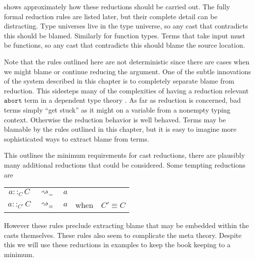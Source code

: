  shows approximately how these reductions should be carried out.
The fully formal reduction rules are listed later, but their complete detail can be distracting.
Type universes live in the type universe, so any cast that contradicts this should be blamed.
Similarly for function types.
Terms that take input must be functions, so any cast that contradicts this should blame the source location.
 
Note that the rules outlined here are not deterministic since there are cases when we might blame or continue reducing the argument.
One of the subtle innovations of the system described in this chapter is to completely separate blame from reduction.
This sidesteps many of the complexities of having a reduction relevant $\mathtt{abort}$ term in a dependent type theory \cite{sjoberg2012irrelevance,pedrot2018failure}.
As far as reduction is concerned, bad terms simply ``get stuck'' as it might on a variable from a nonempty typing context.
Otherwise the reduction behavior is well behaved.
Terms may be blamable by the rules outlined in this chapter, but it is easy to imagine more sophisticated ways to extract blame from terms.
 
This outlines the minimum requirements for cast reductions, there are plausibly many additional reductions that could be considered.
Some tempting reductions are
 
\begin{tabular}{ccccc}
$a::_{C}C$ & $\rightsquigarrow_{=}$ & $a$ &  & \tabularnewline
$a::_{C'}C$ & $\rightsquigarrow_{\equiv}$ & $a$ & when & $C'\equiv C$\tabularnewline
\end{tabular}
 
However these rules preclude extracting blame that may be embedded within the casts themselves.
These rules also seem to complicate the meta theory.
Despite this we will use these reductions in examples to keep the book keeping to a minimum.
 




